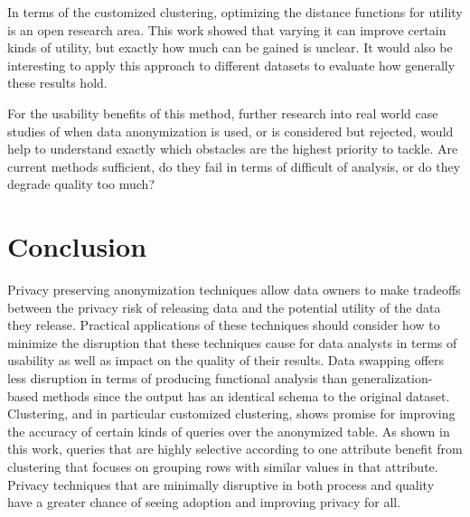 In terms of the customized clustering, optimizing the distance functions for utility is an open research area. This work showed that varying it can improve certain kinds of utility, but exactly how much can be gained is unclear. It would also be interesting to apply this approach to different datasets to evaluate how generally these results hold.

For the usability benefits of this method, further research into real world case studies of when data anonymization is used, or is considered but rejected, would help to understand exactly which obstacles are the highest priority to tackle. Are current methods sufficient, do they fail in terms of difficult of analysis, or do they degrade quality too much?

\section{Conclusion}
Privacy preserving anonymization techniques allow data owners to make tradeoffs between the privacy risk of releasing data and the potential utility of the data they release. Practical applications of these techniques should consider how to minimize the disruption that these techniques cause for data analysts in terms of usability as well as impact on the quality of their results. Data swapping offers less disruption in terms of producing functional analysis than generalization-based methods since the output has an identical schema to the original dataset. Clustering, and in particular customized clustering, shows promise for improving the accuracy of certain kinds of queries over the anonymized table. As shown in this work, queries that are highly selective according to one attribute benefit from clustering that focuses on grouping rows with similar values in that attribute. Privacy techniques that are minimally disruptive in both process and quality have a greater chance of seeing adoption and improving privacy for all.



% 





